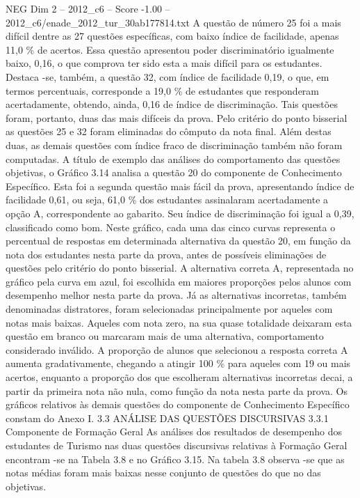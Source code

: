 \begin{textsample}{NEG Dim 2 – 2012\_c6 – Score -1.00 – 2012\_c6/enade\_2012\_tur\_30ab177814.txt}
A questão de número 25 foi a mais difícil dentre as 27 questões específicas, com baixo índice de facilidade, apenas 11,0 \% de acertos.
Essa questão apresentou poder discriminatório igualmente baixo, 0,16, o que comprova ter sido esta a mais difícil para os estudantes.
Destaca -se, também, a questão 32, com índice de facilidade 0,19, o que, em termos percentuais, corresponde a 19,0 \% de estudantes que responderam acertadamente, obtendo, ainda, 0,16 de índice de discriminação.
Tais questões foram, portanto, duas das mais difíceis da prova.
Pelo critério do ponto bisserial as questões 25 e 32 foram eliminadas do cômputo da nota final.
Além destas duas, as demais questões com índice fraco de discriminação também não foram computadas.
A título de exemplo das análises do comportamento das questões objetivas, o Gráfico 3.14 analisa a questão 20 do componente de Conhecimento Específico.
Esta foi a segunda questão mais fácil da prova, apresentando índice de facilidade 0,61, ou seja, 61,0 \% dos estudantes assinalaram acertadamente a opção A, correspondente ao gabarito.
Seu índice de discriminação foi igual a 0,39, classificado como bom.
Neste gráfico, cada uma das cinco curvas representa o percentual de respostas em determinada alternativa da questão 20, em função da nota dos estudantes nesta parte da prova, antes de possíveis eliminações de questões pelo critério do ponto bisserial.
A alternativa correta A, representada no gráfico pela curva em azul, foi escolhida em maiores proporções pelos alunos com desempenho melhor nesta parte da prova.
Já as alternativas incorretas, também denominadas distratores, foram selecionadas principalmente por aqueles com notas mais baixas.
Aqueles com nota zero, na sua quase totalidade deixaram esta questão em branco ou marcaram mais de uma alternativa, comportamento considerado inválido.
A proporção de alunos que selecionou a resposta correta A aumenta gradativamente, chegando a atingir 100 \% para aqueles com 19 ou mais acertos, enquanto a proporção dos que escolheram alternativas incorretas decai, a partir da primeira nota não nula, como função da nota nesta parte da prova.
Os gráficos relativos às demais questões do componente de Conhecimento Específico constam do Anexo I. 3.3 ANÁLISE DAS QUESTÕES DISCURSIVAS 3.3.1 Componente de Formação Geral As análises dos resultados de desempenho dos estudantes de Turismo nas duas questões discursivas relativas à Formação Geral encontram -se na Tabela 3.8 e no Gráfico 3.15.
Na tabela 3.8 observa -se que as notas médias foram mais baixas nesse conjunto de questões do que no das objetivas.

\end{textsample}
